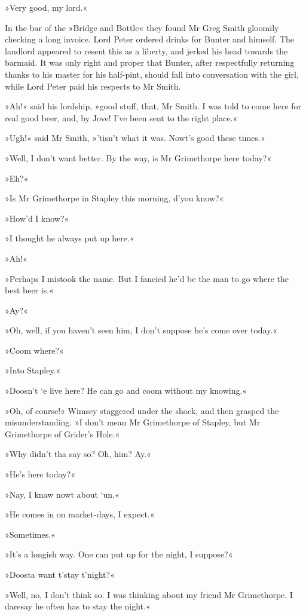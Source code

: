 »Very good, my lord.«

In the bar of the »Bridge and Bottle« they found Mr Greg Smith gloomily checking a long invoice. Lord Peter ordered drinks for Bunter and himself. The landlord appeared to resent this as a liberty, and jerked his head towards the barmaid. It was only right and proper that Bunter, after respectfully returning thanks to his master for his half-pint, should fall into conversation with the girl, while Lord Peter paid his respects to Mr Smith.

»Ah!« said his lordship, »good stuff, that, Mr Smith. I was told to come here for real good beer, and, by Jove! I've been sent to the right place.«

»Ugh!« said Mr Smith, »'tisn't what it was. Nowt's good these times.«

»Well, I don't want better. By the way, is Mr Grimethorpe here today?«

»Eh?«

»Is Mr Grimethorpe in Stapley this morning, d'you know?«

»How'd I know?«

»I thought he always put up here.«

»Ah!«

»Perhaps I mistook the name. But I fancied he'd be the man to go where the best beer is.«

»Ay?«

»Oh, well, if you haven't seen him, I don't suppose he's come over today.«

»Coom where?«

»Into Stapley.«

»Doosn't `e live here? He can go and coom without my knowing.«

»Oh, of course!« Wimsey staggered under the shock, and then grasped the misunderstanding. »I don't mean Mr Grimethorpe of Stapley, but Mr Grimethorpe of Grider's Hole.«

»Why didn't tha say so? Oh, him? Ay.«

»He's here today?«

»Nay, I knaw nowt about `un.«

»He comes in on market-days, I expect.«

»Sometimes.«

»It's a longish way. One can put up for the night, I suppose?«

»Doosta want t'stay t'night?«

»Well, no, I don't think so. I was thinking about my friend Mr Grimethorpe. I daresay he often has to stay the night.«

